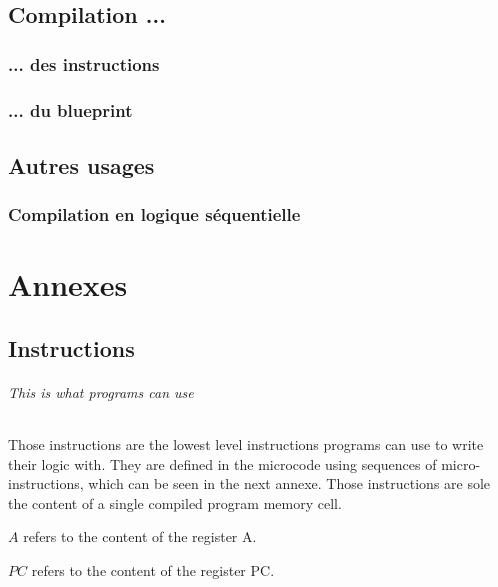 \documentclass{scrreprt}
\begin{document}
	\chapter{Compilation ...}
	\section{... des instructions}
	
	\section{... du blueprint}
	
	\chapter{Autres usages}
	\section{Compilation en logique séquentielle}
	
	\cleardoublepage
	\pagebreak
	\part{Annexes}
	
	
	\chapter{Instructions}
	\paragraph{This is what programs can use}
	Those instructions are the lowest level instructions programs can use to write their logic with. 
	They are defined in the microcode using sequences of micro- instructions, which can be seen in the next annexe.
	Those instructions are sole the content of a single compiled program memory cell.
	
	\textbf{$A$} refers to the content of the register A.
	
	\textbf{$PC$} refers to the content of the register PC.
	
\end{document}
